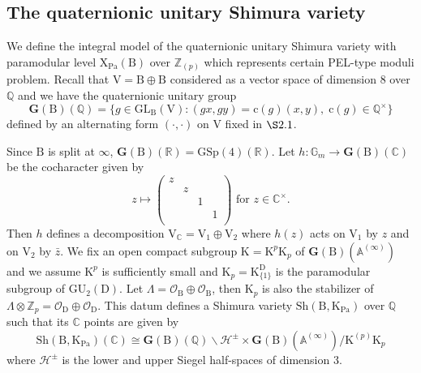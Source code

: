 \documentclass[10pt]{amsart}
\numberwithin{equation}{section}
\theoremstyle{definition}
\def\GL{\mathrm{GL}}
\def\GSp{\mathrm{GSp}}
\def\GU{\mathrm{GU}}
\def\Pa{\mathrm{Pa}}
\def\calH{\mathcal{H}}
\def\calO{\mathcal{O}}
\def\CC{\mathbb{C}}
\def\GG{\mathbb{G}}
\def\bfG{\mathbf{G}}
\def\QQ{\mathbb{Q}}
\def\RR{\mathbb{R}}
\def\ZZ{\mathbb{Z}}
\def\rmc{\mathrm{c}}
\def\rmB{\mathrm{B}}
\def\rmD{\mathrm{D}}
\def\rmK{\mathrm{K}}
\def\rmV{\mathrm{V}}
\def\rmX{\mathrm{X}}
\def\Sh{\mathrm{Sh}}
\begin{document}
\subsection{The quaternionic unitary Shimura variety}
We define the integral model of the quaternionic unitary Shimura variety with paramodular level $\rmX_{\Pa}(\rmB)$ over $\ZZ_{(p)}$ which represents certain PEL-type moduli problem. Recall that $\rmV=\rmB\oplus \rmB$ considered as a vector space of dimension $8$ over $\QQ$ and we have
the quaternionic unitary group
\begin{equation*}
\bfG(\rmB)(\QQ)=\{g\in \GL_{\rmB}(\rmV): (gx, gy)=\rmc(g)(x, y),\phantom{.}\rmc(g)\in\QQ^{\times}\}
\end{equation*}
defined by an alternating form $(\cdot,\cdot)$ on $\rmV$ fixed in $\S 2.1$. 

Since $\rmB$ is split at $\infty$, $\bfG(\rmB)(\RR)=\GSp(4)(\RR)$. Let $h: \GG_{m}\rightarrow \bfG(\rmB)(\CC)$ be the cocharacter given by
\begin{equation*}
z\mapsto\begin{pmatrix} z&&&\\&z&&\\&&1&\\&&&1\\ \end{pmatrix}\text{ for }z\in\CC^{\times}.
\end{equation*}
Then $h$ defines a decomposition $\rmV_{\CC}=\rmV_{1}\oplus \rmV_{2}$ where $h(z)$ acts on $\rmV_{1}$ by $z$ and on $\rmV_{2}$ by $\bar{z}$. We fix an open compact subgroup $\rmK=\rmK^{p}\rmK_{p}$ of $\bfG(\rmB)(\mathbb{A}^{(\infty)})$ and we assume $\rmK^{p}$ is sufficiently small and $\rmK_{p}=\rmK^{\rmD}_{\{1\}}$ is the paramodular subgroup of $\GU_{2}(\rmD)$.
Let $\Lambda=\calO_{\rmB}\oplus\calO_{\rmB}$, then $\rmK_{p}$ is also the stabilizer of $\Lambda\otimes \ZZ_{p}=\calO_{\rmD}\oplus\calO_{\rmD}$. 
This datum defines a Shimura variety $\Sh(\rmB, \rmK_{\Pa})$ over $\QQ$ such that its $\CC$ points are given by
\begin{equation*}
\Sh(\rmB, \rmK_{\Pa})(\CC)\cong \bfG(\rmB)(\QQ)\backslash \calH^{\pm }\times \bfG(\rmB)(\mathbb{A}^{(\infty)})/\rmK^{(p)}\rmK_{p} 
\end{equation*}
where $\calH^{\pm}$ is the lower and upper Siegel half-spaces of dimension $3$. 
\end{document}
